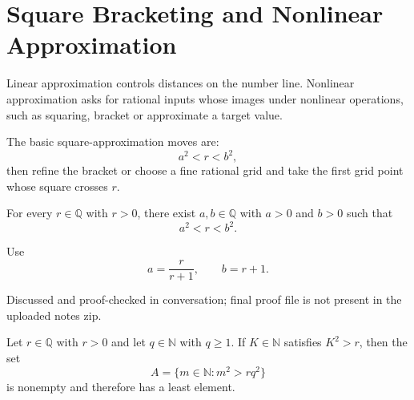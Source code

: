 
\section{Square Bracketing and Nonlinear Approximation}
\label{sec:square-bracketing-nonlinear-approximation}

Linear approximation controls distances on the number line.  Nonlinear approximation asks for rational inputs whose images under nonlinear operations, such as squaring, bracket or approximate a target value.

\begin{tcolorbox}[colback=thmbox, colframe=thmborder, arc=2pt,
  left=6pt, right=6pt, top=4pt, bottom=4pt,
  title={\small\textbf{Toolkit --- Square Approximation}},
  fonttitle=\small\bfseries]
The basic square-approximation moves are:
\[
a^2<r<b^2,
\]
then refine the bracket or choose a fine rational grid and take the first grid point whose square crosses $r$.
\end{tcolorbox}

\begin{tcolorbox}[colback=thmbox, colframe=thmborder, arc=2pt,
  left=6pt, right=6pt, top=4pt, bottom=4pt,
  title={\small\textbf{Theorem (Rational Square Bracketing)}},
  fonttitle=\small\bfseries]
\begin{theorem}
\label{thm:rational-square-bracketing}
For every $r\in\mathbb{Q}$ with $r>0$, there exist $a,b\in\mathbb{Q}$ with $a>0$ and $b>0$ such that
\[
a^2<r<b^2.
\]
\end{theorem}
\end{tcolorbox}

\begin{remark*}
Use
\[
a=\frac{r}{r+1},\qquad b=r+1.
\]
\end{remark*}

\begin{remark*}[Status]
Discussed and proof-checked in conversation; final proof file is not present in the uploaded notes zip.
\end{remark*}

\begin{tcolorbox}[colback=thmbox, colframe=thmborder, arc=2pt,
  left=6pt, right=6pt, top=4pt, bottom=4pt,
  title={\small\textbf{Lemma (First Grid Point Crossing)}},
  fonttitle=\small\bfseries]
\begin{lemma}
\label{lem:first-grid-point-crossing}
Let $r\in\mathbb{Q}$ with $r>0$ and let $q\in\mathbb{N}$ with $q\ge 1$. If $K\in\mathbb{N}$ satisfies $K^2>r$, then the set
\[
A=\{m\in\mathbb{N}:m^2>rq^2\}
\]
is nonempty and therefore has a least element.
\end{lemma}
\end{tcolorbox}

